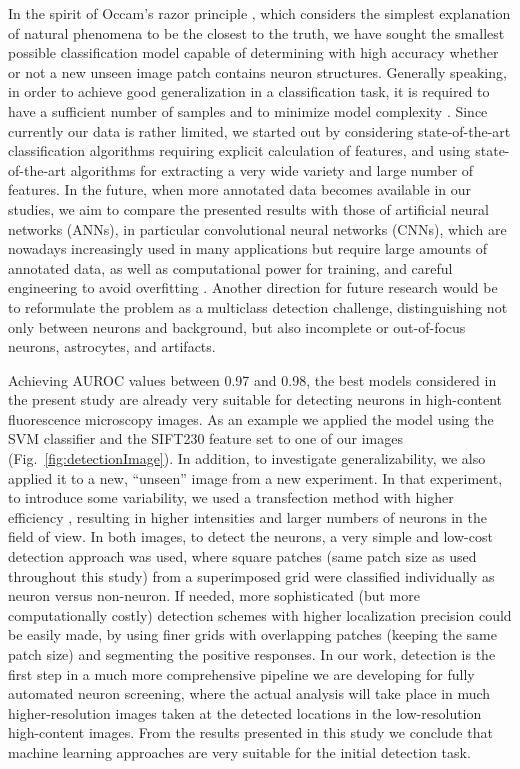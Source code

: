 In the spirit of Occam's razor principle \cite{Iacca201217, Hong2013210, Ebrahimpour2017214}, which considers the simplest explanation of natural phenomena to be the closest to the truth, we have sought the smallest possible classification model capable of determining with high accuracy whether or not a new unseen image patch contains neuron structures. Generally speaking, in order to achieve good generalization in a classification task, it is required to have a sufficient number of samples and to minimize model complexity \cite{Gupta20171}. Since currently our data is rather limited, we started out by considering state-of-the-art classification algorithms requiring explicit calculation of features, and using state-of-the-art algorithms for extracting a very wide variety and large number of features. In the future, when more annotated data becomes available in our studies, we aim to compare the presented results with those of artificial neural networks (ANNs), in particular convolutional neural networks (CNNs), which are nowadays increasingly used in many applications \cite{LeCun-2015} but require large amounts of annotated data, as well as computational power for training, and careful engineering to avoid overfitting \cite{6697897, Greenspan-2016, Tajbakhsh-2016, Shaikhina201751, Litjens-2017, Shen-2017}. {\color{red}Another direction for future research would be to reformulate the problem as a} {\color{red}multiclass detection challenge, distinguishing not only between neurons and background, but also incomplete or out-of-focus neurons, astrocytes, and artifacts.}

Achieving AUROC values between {\color{red}0.97 and 0.98, the best models considered in the present study are already very suitable for detecting neurons in high-content fluorescence microscopy images. As an example we applied the model using the SVM classifier and the SIFT230 feature set to one of our images (Fig.~\ref{fig:detectionImage}). In addition, to investigate generalizability, we also applied it to a new, ``unseen'' image from a new experiment. In that experiment, to introduce some variability, we used a transfection method with higher efficiency \cite{Bredenbeek1993}, resulting in higher intensities and larger numbers of neurons in the field of view. In both images, to detect the neurons,} a very simple and low-cost detection approach was used, where square patches (same patch size as used throughout this study) from a superimposed grid were classified individually as neuron versus non-neuron. If needed, more sophisticated (but more computationally costly) detection schemes with higher localization precision could be easily made, by using finer grids with overlapping patches (keeping the same patch size) and segmenting the positive responses. In our work, detection is the first step in a much more comprehensive pipeline we are developing for fully automated neuron screening, where the actual analysis will take place in much higher-resolution images taken at the detected locations in the low-resolution high-content images. From the results presented in this study we conclude that machine learning approaches are very suitable for the initial detection task.

